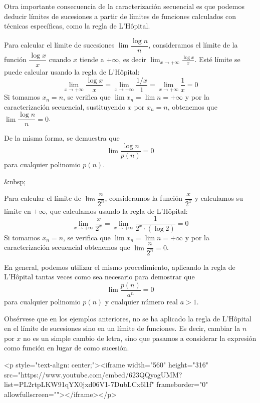 Otra importante consecuencia de la caracterización secuencial es que podemos deducir límites de sucesiones a partir de límites de funciones calculados con técnicas específicas, como la regla de L'Hôpital. 
%
\begin{ejemplo}\label{ej:logndivn}
Para calcular el límite de sucesiones $\lim\dfrac{\log n}{n}$, consideramos el límite de la función $\dfrac{\log x}{x}$ cuando $x$ tiende a $+\infty$, es decir $\displaystyle\lim_{x\to+\infty}\frac{\log x}{x}$.
Esté límite se puede calcular usando la regla de L'Hôpital:
\[
\lim_{x\to+\infty}\frac{\log x}{x} =
\lim_{x\to+\infty}\frac{1/x}{1} =
\lim_{x\to+\infty}\frac{1}{x} = 0
\]
Si tomamos $x_n=n$, se verifica que $\lim x_n=\lim n=+\infty$ y por la caracterización secuencial, sustituyendo $x$ por $x_n=n$, obtenemos que $\lim\dfrac{\log n}{n}=0$.

De la misma forma, se demuestra que
\[
\lim\dfrac{\log n}{p(n)}=0
\]
para cualquier polinomio $p(n)$.\fej
\end{ejemplo}
\begin{rawhtml}
&nbsp;
\end{rawhtml}
\begin{ejemplo}\label{ej:ndiv2n}
Para calcular el límite de $\lim\dfrac{n}{2^n}$, consideramos la función $\dfrac{x}{2^x}$ y calculamos su límite en $+\infty$, que calculamos usando la regla de L'Hôpital:
\[
\lim_{x\to+\infty}\dfrac{x}{2^x} =
\lim_{x\to+\infty}\dfrac{1}{2^x\cdot(\log 2)} = 0
\]
Si tomamos $x_n=n$, se verifica que $\lim x_n=\lim n=+\infty$ y por la caracterización secuencial
obtenemos que $\lim\dfrac{n}{2^n}=0$.

En general, podemos utilizar el mismo procedimiento, aplicando la regla de L'Hôpital tantas veces como sea necesario para demostrar que 
\[
\lim\dfrac{p(n)}{a^n}=0
\]
para cualquier polinomio $p(n)$ y cualquier número real $a>1$.\fej
\end{ejemplo}

Obsérvese que en los ejemplos anteriores, no se ha aplicado la regla de L'Hôpital en el límite de sucesiones sino en un límite de funciones.
Es decir, cambiar la $n$ por $x$ no es un simple cambio de letra, sino que pasamos a considerar la expresión como función en lugar de como sucesión.

\begin{rawhtml}
<p style="text-align: center;"><iframe width="560" height="316" src="https://www.youtube.com/embed/623QQyogUMM?list=PL2rtpLKW91qYX0jxd06V1-7DubLCx6l1f" frameborder="0" allowfullscreen=""></iframe></p>
\end{rawhtml}

